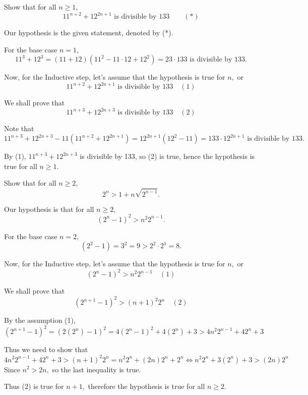 \documentclass{article}
\begin{document}
\begin{example}
    Show that for all $n \ge 1,$
    \[
        11^{n+2} + 12^{2n+1} \text{\ is divisible by\ } 133 \qquad (*)
    \]
\end{example}

\begin{soln}
    Our hypothesis is the given statement, denoted by (*).

    For the base case $n=1,$ 
    \[
        11^{3} + 12^{3} = (11+12)(11^2 - 11\cdot 12 + 12^2) = 23 \cdot 133 \text{\ is divisible by\ } 133.
    \]
    
    Now, for the Inductive step, let's assume that the hypothesis is true for $n,$ or
    \[
        11^{n+2} + 12^{2n+1} \text{\ is divisible by\ } 133 \quad (1)
    \]

    We shall prove that
    \[
        11^{n+3} + 12^{2n+3} \text{\ is divisible by\ } 133 \quad (2)
    \]

    Note that 
    \[
        11^{n+3} + 12^{2n+3} - 11(11^{n+2} + 12^{2n+1}) = 12^{2n+1}(12^2 - 11) = 133 \cdot 12^{2n+1} \text{\ is divisible by\ } 133.
    \]
    
    By (1), $11^{n+3} + 12^{2n+3}$ is divisible by 133, so (2) is true, hence the hypothesis is true for all $n \ge 1.$
\end{soln}

\begin{example}
    Show that for all $n \ge 2,$
    \[
        2^n > 1 + n\sqrt{2^{n-1}}.
    \]
\end{example}

\begin{soln}
    Our hypothesis is that for all $n \ge 2,$
    \[
        (2^n - 1)^2 > n^2 2^{n-1}.
    \]

    For the base case $n=2,$ 
    \[
        (2^2 -1) = 3^2  = 9 > 2^2 \cdot 2^1 = 8.
    \]
    
    Now, for the Inductive step, let's assume that the hypothesis is true for $n,$ or
    \[
        (2^n - 1)^2 > n^2 2^{n-1} \quad (1)
    \]

    We shall prove that
    \[
        (2^{n+1} - 1)^2 > (n+1)^2 2^{n} \quad (2)
    \]

    By the assumption (1),
    \[
        (2^{n+1} - 1)^2 = (2(2^n)-1)^2 = 4(2^n-1)^2 + 4(2^n) + 3 
        > 4 n^2 2^{n-1} + 4 2^n + 3 
    \]
    
    Thus we need to show that
    \[
        4 n^2 2^{n-1} + 4 2^n + 3 > (n+1)^2 2^{n} = n^2 2^{n} + (2n)2^n + 2^n
        \Leftrightarrow n^2 2^{n} + 3 (2^n) + 3 > (2n)2^n
    \]
    Since $n^2 > 2n,$ so the last inequality is true.
    
    Thus (2) is true for $n+1,$ therefore the hypothesis is true for all $n \ge 2.$
\end{soln}
\end{document}
